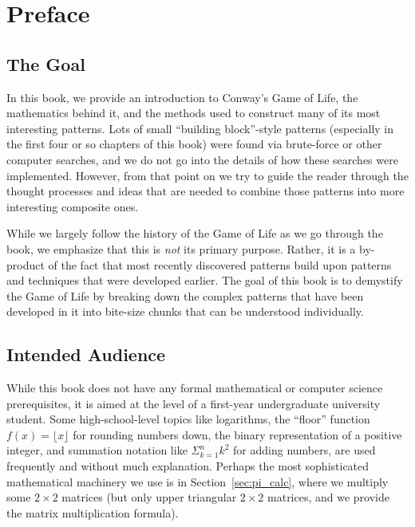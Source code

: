 \renewcommand{\chapterfolder}{preface/}
\chapter{Preface}


\section*{The Goal}

In this book, we provide an introduction to Conway's Game of Life, the mathematics behind it, and the methods used to construct many of its most interesting patterns. Lots of small ``building block''-style patterns (especially in the first four or so chapters of this book) were found via brute-force or other computer searches, and we do not go into the details of how these searches were implemented. However, from that point on we try to guide the reader through the thought processes and ideas that are needed to combine those patterns into more interesting composite ones.

While we largely follow the history of the Game of Life as we go through the book, we emphasize that this is \emph{not} its primary purpose. Rather, it is a by-product of the fact that most recently discovered patterns build upon patterns and techniques that were developed earlier. The goal of this book is to demystify the Game of Life by breaking down the complex patterns that have been developed in it into bite-size chunks that can be understood individually.


\section*{Intended Audience}

While this book does not have any formal mathematical or computer science prerequisites, it is aimed at the level of a first-year undergraduate university student. Some high-school-level topics like logarithms, the ``floor'' function $f(x) = \lfloor x \rfloor$ for rounding numbers down, the binary representation of a positive integer, and summation notation like $\Sigma_{k=1}^n k^2$ for adding numbers, are used frequently and without much explanation. Perhaps the most sophisticated mathematical machinery we use is in Section~\ref{sec:pi_calc}, where we multiply some $2 \times 2$ matrices (but only upper triangular $2 \times 2$ matrices, and we provide the matrix multiplication formula).

